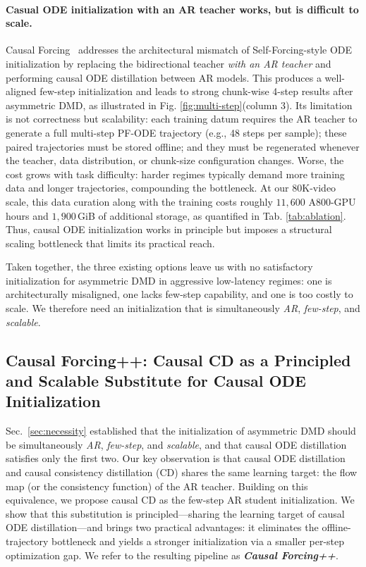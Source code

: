 \paragraph{Casual ODE initialization with an AR teacher works, but is difficult to scale.}
Causal Forcing~\cite{zhu2026causal} addresses the architectural mismatch of Self-Forcing-style ODE initialization by replacing the bidirectional teacher \emph{with an AR teacher} and performing causal ODE distillation between AR models. This produces a well-aligned few-step initialization and leads to strong chunk-wise 4-step results after asymmetric DMD, as illustrated in Fig. \ref{fig:multi-step}(column 3). Its limitation is not correctness but scalability: each training datum requires the AR teacher to generate a full multi-step PF-ODE trajectory (e.g., 48 steps per sample); these paired trajectories must be stored offline; and they must be regenerated whenever the teacher, data distribution, or chunk-size configuration changes. Worse, the cost grows with task difficulty: harder regimes typically demand more training data and longer trajectories, compounding the bottleneck.
At our 80K-video scale, this data curation along with the training costs roughly $11{,}600$ A800-GPU hours and $1{,}900$\,GiB of additional storage, as quantified in Tab. \ref{tab:ablation}. Thus, causal ODE initialization works in principle but imposes a structural scaling bottleneck that limits its practical reach.

Taken together, the three existing options leave us with no satisfactory initialization for asymmetric DMD in aggressive low-latency regimes: one is architecturally misaligned, one lacks few-step capability, and one is too costly to scale. We therefore need an initialization that is simultaneously \emph{AR}, \emph{few-step}, and \emph{scalable}. 

\subsection{Causal Forcing++: Causal CD as a Principled and Scalable Substitute for Causal ODE Initialization}
\label{sec:substitute}

Sec.~\ref{sec:necessity} established that the initialization of asymmetric DMD should be simultaneously \emph{AR}, \emph{few-step}, and \emph{scalable}, and that causal ODE distillation~\cite{zhu2026causal} satisfies only the first two. Our key observation is that causal ODE distillation and causal consistency distillation (CD) shares the same learning target: the flow map (or the consistency function) of the AR teacher. Building on this equivalence, we propose causal CD as the few-step AR student initialization. We show that this substitution is principled---sharing the learning target of causal ODE distillation---and brings two practical advantages: it eliminates the offline-trajectory bottleneck and yields a stronger initialization via a smaller per-step optimization gap. We refer to the resulting pipeline as \textbf{\textit{Causal Forcing++}}.


